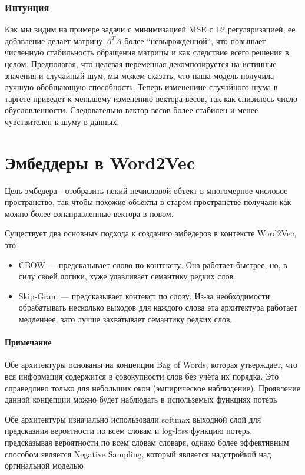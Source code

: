 \documentclass{article}
\begin{document}
    \subsubsection{Интуиция}

    Как мы видим на примере задачи с минимизацией MSE с L2 регуляризацией, ее добавление делает 
    матрицу $A^{T} A$ более ``невырожденной``, что повышает численную стабильность обращения матрицы и как 
    следствие всего решения в целом. Предполагая, что целевая переменная
    декомпозируется на истинные значения и случайный 
    шум, мы можем сказать, что наша модель получила лучшую обобщающую способность. Теперь изменениие
    случайного шума в таргете приведет к меньшему изменению вектора весов, так как снизилось число обусловленности.
    Следовательно вектор весов более стабилен и менее чувствителен к шуму в данных. 


    \section{Эмбеддеры в Word2Vec}
    Цель эмбедера - отобразить некий нечисловой объект в многомерное числовое пространство, так чтобы похожие 
    объекты в старом пространстве получали как можно более сонаправленные вектора в новом. 

    Существует два основных подхода к созданию эмбедеров в контексте Word2Vec, это 
    \begin{itemize}
        \item CBOW --- предсказывает слово по контексту. 
        Она работает быстрее, но, в силу своей логики, хуже улавливает семантику редких слов.
        \item Skip-Gram --- предсказывает контекст по слову. 
        Из-за необходимости обрабатывать несколько выходов для каждого слова 
        эта архитектура работает медленнее, зато лучше захватывает семантику редких слов.  
    \end{itemize}
    
    \paragraph*{Примечание}  
    Обе архитектуры основаны на концепции Bag of Words, которая утверждает, что 
    вся информация содержится в совокупности слов без учёта их порядка. Это справедливо только для небольших окон (эмпирическое наблюдение). Проявление 
    данной концепции можно будет наблюдать в использемых функциях потерь

    Обе архитектуры изначально использовали softmax выходной слой для предсказния вероятности по всем словам и log-loss 
    функцию потерь, предсказывая вероятности по всем словам словаря, однако более эффективным способом является Negative Sampling, 
    который является надстройкой над оргинальной моделью
\end{document}
